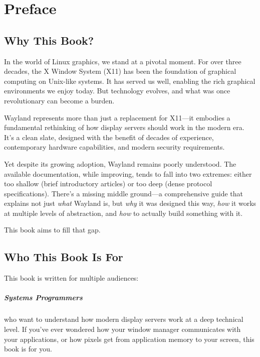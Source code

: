 
\chapter*{Preface}

\section*{Why This Book?}

In the world of Linux graphics, we stand at a pivotal moment. For over three decades, the X Window System (X11) has been the foundation of graphical computing on Unix-like systems. It has served us well, enabling the rich graphical environments we enjoy today. But technology evolves, and what was once revolutionary can become a burden.

Wayland represents more than just a replacement for X11—it embodies a fundamental rethinking of how display servers should work in the modern era. It's a clean slate, designed with the benefit of decades of experience, contemporary hardware capabilities, and modern security requirements.

Yet despite its growing adoption, Wayland remains poorly understood. The available documentation, while improving, tends to fall into two extremes: either too shallow (brief introductory articles) or too deep (dense protocol specifications). There's a missing middle ground—a comprehensive guide that explains not just \textit{what} Wayland is, but \textit{why} it was designed this way, \textit{how} it works at multiple levels of abstraction, and \textit{how} to actually build something with it.

This book aims to fill that gap.

\section*{Who This Book Is For}

This book is written for multiple audiences:

\paragraph{Systems Programmers} who want to understand how modern display servers work at a deep technical level. If you've ever wondered how your window manager communicates with your applications, or how pixels get from application memory to your screen, this book is for you.

